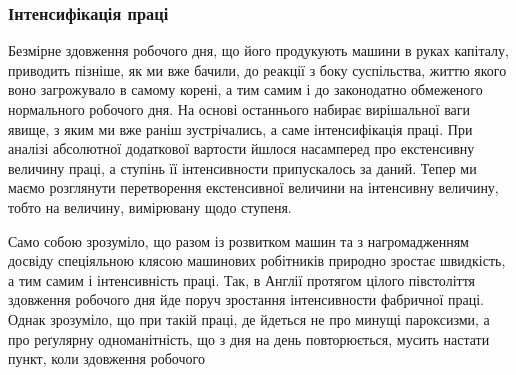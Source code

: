 \subsubsection[Інтенсифікація праці]{Інтенсифікація праці \footnotemarkZ{}}

Безмірне здовження робочого дня, що його продукують машини
в руках капіталу, приводить пізніше, як ми вже бачили, до
реакції з боку суспільства, життю якого воно загрожувало в
самому корені, а тим самим і до законодатно обмеженого нормального
робочого дня. На основі останнього набирає вирішальної
ваги явище, з яким ми вже раніш зустрічались, а саме інтенсифікація
праці. При аналізі абсолютної додаткової вартости йшлося
насамперед про екстенсивну величину праці, а ступінь її інтенсивности
припускалось за даний. Тепер ми маємо розглянути
перетворення екстенсивної величини на інтенсивну величину,
тобто на величину, вимірювану щодо ступеня.

Само собою зрозуміло, що разом із розвитком машин та з нагромадженням
досвіду спеціяльною клясою машинових робітників
природно зростає швидкість, а тим самим і інтенсивність
праці. Так, в Англії протягом цілого півстоліття здовження
робочого дня йде поруч зростання інтенсивности фабричної праці.
Однак зрозуміло, що при такій праці, де йдеться не про минущі
пароксизми, а про реґулярну одноманітність, що з дня на день
повторюється, мусить настати пункт, коли здовження робочого
\parbreak{}  %
